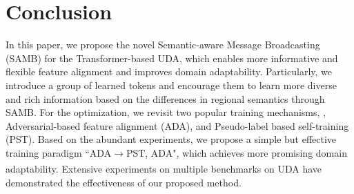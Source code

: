 \documentclass[journal]{IEEEtran}
\begin{document}
\section{Conclusion}
\label{sec:conlusion}
 In this paper, we propose the novel Semantic-aware Message Broadcasting (SAMB) for the Transformer-based UDA, which enables more informative and flexible feature alignment and improves domain adaptability. Particularly, we introduce a group of learned tokens and encourage them to learn more diverse and rich information based on the differences in regional semantics through SAMB. For the optimization, we revisit two popular training mechanisms, \ieno, Adversarial-based feature alignment (ADA), and Pseudo-label based self-training (PST). Based on the abundant experiments, we propose a simple but effective training paradigm ``ADA$\xrightarrow[]{}$PST, ADA", which achieves more promising domain adaptability. Extensive experiments on multiple benchmarks on UDA have demonstrated the effectiveness of our proposed method.




















































\end{document}
